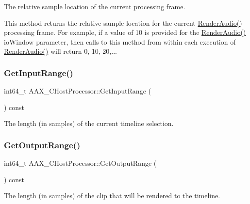 The relative sample location of the current processing frame. 

This method returns the relative sample location for the current \mbox{\hyperlink{a01485_a66e6a701d8dd7d69accde128cb98b342}{Render\+Audio()}} processing frame. For example, if a value of 10 is provided for the \mbox{\hyperlink{a01485_a66e6a701d8dd7d69accde128cb98b342}{Render\+Audio()}} {\ttfamily io\+Window} parameter, then calls to this method from within each execution of \mbox{\hyperlink{a01485_a66e6a701d8dd7d69accde128cb98b342}{Render\+Audio()}} will return 0, 10, 20,... \mbox{\label{a01485_a2b93d94600b7d356bba14e070b8b40a3}} 
\subsubsection{\texorpdfstring{GetInputRange()}{GetInputRange()}}
{\footnotesize\ttfamily int64\+\_\+t A\+A\+X\+\_\+\+C\+Host\+Processor\+::\+Get\+Input\+Range (\begin{DoxyParamCaption}{ }\end{DoxyParamCaption}) const\hspace{0.3cm}{\ttfamily [inline]}}



The length (in samples) of the current timeline selection. 

\mbox{\label{a01485_a921f63ec72c167cb673582ca92f934b6}} 
\subsubsection{\texorpdfstring{GetOutputRange()}{GetOutputRange()}}
{\footnotesize\ttfamily int64\+\_\+t A\+A\+X\+\_\+\+C\+Host\+Processor\+::\+Get\+Output\+Range (\begin{DoxyParamCaption}{ }\end{DoxyParamCaption}) const\hspace{0.3cm}{\ttfamily [inline]}}



The length (in samples) of the clip that will be rendered to the timeline. 

\mbox{\label{a01485_aec4fa455a4e8ecccc245ce30b596c7b4}} 
